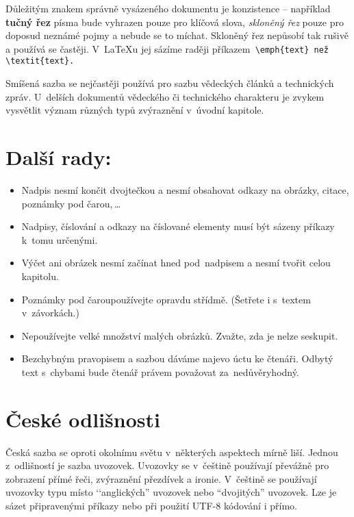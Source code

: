 \documentclass[a4paper,10pt,twocolumn]{article}
\begin{document}
Důležitým znakem správně vysázeného dokumentu je konzistence -- například \textbf{tučný řez} písma bude vyhrazen pouze pro klíčová slova, \emph{skloněný řez} pouze pro doposud neznámé pojmy a nebude se to míchat. Skloněný řez nepůsobí tak rušivě a používá se častěji. V~\LaTeX u jej sázíme raději příkazem\verb/ \emph{text} než \textit{text}. /

Smíšená sazba se nejčastěji používá pro sazbu vědeckých článků a technických zpráv. U~delších dokumentů vědeckého či technického charakteru je zvykem vysvětlit význam různých typů zvýraznění v~úvodní kapitole.


\section{Další rady:}\label{section3}
\begin{itemize}
\item Nadpis nesmí končit dvojtečkou a nesmí obsahovat odkazy na obrázky, citace, poznámky pod čarou,\,\dots

\item Nadpisy, číslování a odkazy na číslované elementy musí být sázeny příkazy k~tomu určenými.
 
\item Výčet ani obrázek nesmí začínat hned pod~nadpisem a nesmí tvořit celou kapitolu.

\item Poznámky pod čarou\footnotemark[1] používejte opravdu střídmě. (Šetřete i s~textem v~závorkách.)

\item Nepoužívejte velké množství malých obrázků. Zvažte, zda je nelze seskupit.

\item Bezchybným pravopisem a sazbou dáváme najevo úctu ke čtenáři. Odbytý text s~chybami bude čtenář právem považovat za~nedůvěryhodný.
\end{itemize}

\section{České odlišnosti}
Česká sazba se oproti okolnímu světu v~některých aspektech mírně liší. Jednou z~odlišností je sazba uvozovek. Uvozovky se v~češtině používají převážně pro zobrazení přímé řeči, zvýraznění přezdívek a ironie. V~češtině se používají uvozovky typu  místo ‘‘anglických'' uvozovek nebo ``dvojitých'' uvozovek. Lze je sázet připravenými příkazy nebo při použití UTF-8 kódování i přímo.
\end{document}
